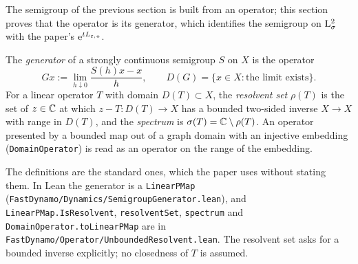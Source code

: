 The semigroup of the previous section is built from an operator; this section proves that the
operator is its generator, which identifies the semigroup on $\mathrm{L}^2_\sigma$ with the paper's
$\mathrm{e}^{tL_{\varepsilon,u}}$.

\begin{definition}
  \label{def:dynamics:generator}
  \leanok
  The \emph{generator} of a strongly continuous semigroup $S$ on $X$ is the operator
  \[
    Gx:=\lim_{h\downarrow0}\frac{S(h)x-x}{h},
    \qquad
    D(G)=\{x\in X:\text{the limit exists}\}.
  \]
  For a linear operator $T$ with domain $D(T)\subset X$, the \emph{resolvent set}
  $\rho(T)$ is the set of $z\in\mathbb{C}$ at which $z-T:D(T)\to X$ has a bounded two-sided inverse
  $X\to X$ with range in $D(T)$, and the \emph{spectrum} is $\sigma(T)=\mathbb{C}\setminus\rho(T)$.
  An operator presented by a bounded map out of a graph domain with an injective embedding
  (\texttt{DomainOperator}) is read as an operator on the range of the embedding.
\end{definition}

The definitions are the standard ones, which the paper uses without stating them.  In Lean the
generator is a \texttt{LinearPMap} (\texttt{FastDynamo/Dynamics/SemigroupGenerator.lean}), and
\texttt{LinearPMap.IsResolvent}, \texttt{resolventSet}, \texttt{spectrum} and
\texttt{DomainOperator.toLinearPMap} are in \texttt{FastDynamo/Operator/UnboundedResolvent.lean}.
The resolvent set asks for a bounded inverse explicitly; no closedness of $T$ is assumed.

